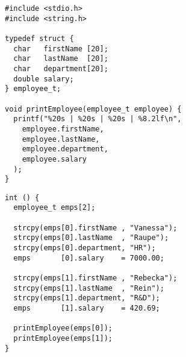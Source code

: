 \begin{frame}[fragile]
%
%
\begin{codebox}[\texttt{structs} in Funktionen, equal height group=GStrPtrXmp]
\begin{verbatim}
#include <stdio.h>
#include <string.h>

typedef struct {
  char   firstName [20];
  char   lastName  [20];
  char   department[20];
  double salary;
} employee_t;

void printEmployee(employee_t employee) {
  printf("%20s | %20s | %20s | %8.2lf\n",
    employee.firstName,
    employee.lastName,
    employee.department,
    employee.salary
  );
}
\end{verbatim}
\end{codebox}
%
\begin{codebox}[...Fortsetzung, equal height group=GStrPtrXmp]
\begin{verbatim}
int () {
  employee_t emps[2];
  
  strcpy(emps[0].firstName , "Vanessa");
  strcpy(emps[0].lastName  , "Raupe");
  strcpy(emps[0].department, "HR");
  emps       [0].salary    = 7000.00;
  
  strcpy(emps[1].firstName , "Rebecka");
  strcpy(emps[1].lastName  , "Rein");
  strcpy(emps[1].department, "R&D");
  emps       [1].salary    = 420.69;
  
  printEmployee(emps[0]);
  printEmployee(emps[1]);
}
\end{verbatim}
\end{codebox}
%
\end{frame}


